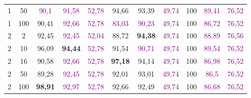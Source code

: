 \begin{table}[ht]
\begin{tabular}{cc|ccc|ccc|ccc}
        {1}                           & {50}    & \textcolor{purple}{90,1}            & \textcolor{purple}{91,58}           & \textcolor{purple}{52,78}                & {94,66}                         & {93,39}                         & \textcolor{purple}{49,74}      & {100}                           & \textcolor{purple}{89,41}       & \textcolor{purple}{76,52}      \\
        {1}                           & {100}   & {90,41}                             & \textcolor{purple}{92,66}           & \textcolor{purple}{52,78}                & \textcolor{purple}{83,03}       & \textcolor{purple}{90,23}       & \textcolor{purple}{49,74}      & {100}                           & \textcolor{purple}{86,72}       & \textcolor{purple}{76,52}      \\
        {2}                           & {2}     & {92,45}                             & \textcolor{purple}{92,45}           & \textcolor{purple}{52,04}                & {88,72}                         & \textbf{94,38}                  & \textcolor{purple}{49,74}      & {100}                           & \textcolor{purple}{88,89}       & \textcolor{purple}{76,56}      \\
        {2}                           & {10}    & {96,09}                             & \textbf{94,44}                      & \textcolor{purple}{52,78}                & {91,54}                         & \textcolor{purple}{90,71}       & \textcolor{purple}{49,74}      & {100}                           & \textcolor{purple}{89,54}       & \textcolor{purple}{76,52}      \\
        {2}                           & {16}    & {90,58}                             & \textcolor{purple}{92,66}           & \textcolor{purple}{52,78}                & \textbf{97,18}                  & {94,14}                         & \textcolor{purple}{49,74}      & {100}                           & \textcolor{purple}{86,98}       & \textcolor{purple}{76,52}      \\
        {2}                           & {50}    & {89,28}                             & \textcolor{purple}{92,45}           & \textcolor{purple}{52,78}                & {92,01}                         & {93,01}                         & \textcolor{purple}{49,74}      & {100}                           & \textcolor{purple}{86,5}        & \textcolor{purple}{76,52}      \\
        {2}                           & {100}   & \textbf{98,91}                      & \textcolor{purple}{92,97}           & \textcolor{purple}{52,78}                & {92,66}                         & {92,49}                         & \textcolor{purple}{49,74}      & {100}                           & \textcolor{purple}{86,68}       & \textcolor{purple}{76,52}      \\

\end{tabular}
\end{table}
